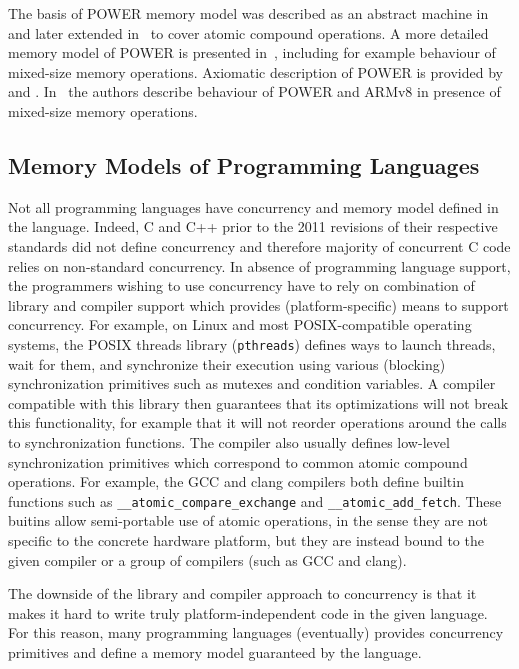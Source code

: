 The basis of POWER memory model was described as an abstract machine
in~ and later extended in~ to cover atomic
compound operations.
A more detailed memory model of POWER is presented in~,
including for example behaviour of mixed-size memory operations.
Axiomatic description of POWER is provided by~ and
.
In~ the authors describe behaviour of POWER and ARMv8 in
presence of mixed-size memory operations.

\subsection{Memory Models of Programming Languages}

Not all programming languages have concurrency and memory model defined in the
language.
Indeed, C and C++ prior to the 2011 revisions of their respective standards did
not define concurrency and therefore majority of concurrent C code relies on
non-standard concurrency.
In absence of programming language support, the programmers wishing to use
concurrency have to rely on combination of library and compiler support which
provides (platform-specific) means to support concurrency.
For example, on Linux and most POSIX-compatible operating systems, the POSIX
threads library (\texttt{pthreads}) defines ways to launch threads, wait for
them, and synchronize their execution using various (blocking) synchronization
primitives such as mutexes and condition variables.
A compiler compatible with this library then guarantees that its optimizations
will not break this functionality, for example that it will not reorder
operations around the calls to synchronization functions.
The compiler also usually defines low-level synchronization primitives which correspond to common atomic compound operations.
For example, the GCC and clang compilers both define builtin functions such as \texttt{\_\_atomic\_compare\_exchange} and \texttt{\_\_atomic\_add\_fetch}.
These buitins allow semi-portable use of atomic operations, in the sense they are not specific to the concrete hardware platform, but they are instead bound to the given compiler or a group of compilers (such as GCC and clang).

The downside of the library and compiler approach to concurrency is that it
makes it hard to write truly platform-independent code in the given language.
For this reason, many programming languages (eventually) provides concurrency
primitives and define a memory model guaranteed by the language.

